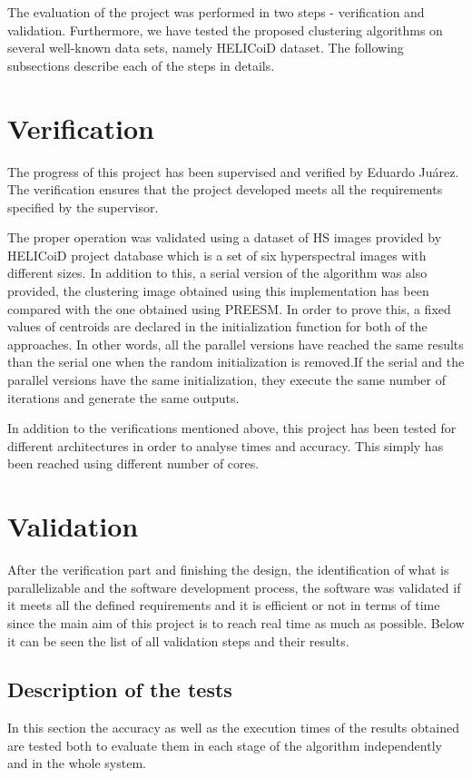 The evaluation of the project was performed in two steps - verification and validation. Furthermore, we have tested the proposed clustering algorithms on several well-known data sets, namely HELICoiD dataset.
The following subsections describe each of the steps in details.
    \section{Verification}
The progress of this project has been supervised and verified by Eduardo Ju\'arez. The verification ensures that the project developed meets all the requirements specified by the supervisor.

The proper operation was validated using a dataset of HS images provided by HELICoiD project database which is a set of six hyperspectral images with different sizes. In addition to this, a serial version of the algorithm was also provided, the clustering image obtained using this implementation has been compared with the one obtained using PREESM. In order to prove this, a fixed values of centroids are declared in the initialization function for both of the approaches. In other words, all the parallel versions have reached the same results than the serial one when the random initialization is removed.If the serial and the parallel versions have the same initialization, they execute the same number of iterations and generate the same outputs.

In addition to the verifications mentioned above, this project has been tested for different architectures in order to analyse times and accuracy. This simply has been reached using different number of cores.

    \section{Validation}
    
After the verification part and finishing the design, the identification of what is parallelizable and the software development process, the software was validated if it meets all the defined requirements and it is efficient or not in terms of time since the main aim of this project is to reach real time as much as possible.  
Below it can be seen the list of all validation steps and their results.  
    \subsection{Description of the tests} 
In this section the accuracy as well as the execution times of the results obtained are tested both to evaluate them in each stage of the algorithm independently and in the whole system.


